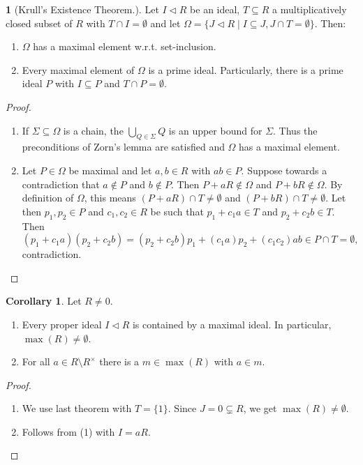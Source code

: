 \documentclass[12pt,a4paper]{report}
\theoremstyle{definition}
\newtheorem{corollary}[theorem]{Corollary} %
\theoremstyle{num.custom-title}
\newtheorem{teo_custom-title}[theorem]{} %
\DeclareMathOperator{\sm}{\setminus}
\DeclareMathOperator{\sse}{\subseteq}
\begin{document}
\begin{teo_custom-title}[Krull's Existence Theorem.] Let $I \lhd R$ be an ideal, $T \sse R$ a multiplicatively closed subset of $R$ with $T \cap I = \emptyset$ and let $\Omega=\{J \lhd R \mid I \sse J, J \cap T = \emptyset\}$. Then:
\begin{enumerate}
\item $\Omega$ has a maximal element w.r.t. set-inclusion.
\item Every maximal element of $\Omega$ is a prime ideal. Particularly, there is a prime ideal $P$ with $I \sse P$ and $T \cap P = \emptyset$.
\end{enumerate}
\begin{proof}\ 
\begin{enumerate}
\item If $\Sigma \sse \Omega$ is a chain, the $\bigcup_{Q \in \Sigma} Q$ is an upper bound for $\Sigma$. Thus the preconditions of Zorn's lemma are satisfied and $\Omega$ has a maximal element.
\item Let $P \in \Omega$ be maximal and let $a,b \in R$ with $ab \in P$. Suppose towards a contradiction that $a \not\in P$ and $b \not\in P$. Then $P+aR \not\in \Omega$ and $P+bR \not\in \Omega$. By definition of $\Omega$, this means $(P+aR) \cap T \neq \emptyset$ and $(P+bR) \cap T \neq \emptyset$. Let then $p_1,p_2 \in P$ and $c_1,c_2 \in R$ be such that $p_1+c_1 a \in T$ and $p_2+c_2 b \in T$. Then
\[
(p_1+c_1 a)(p_2+c_2 b)=(p_2+c_2 b)p_1 + (c_1 a) p_2 + (c_1 c_2)ab \in P \cap T = \emptyset,
\]
contradiction.
\end{enumerate}
\end{proof}
\end{teo_custom-title}

\begin{corollary}
Let $R \neq 0$.
\begin{enumerate}
\item Every proper ideal $I \lhd R$ is contained by a maximal ideal. In particular, $\max(R) \neq \emptyset$.
\item For all $a \in R \sm R^\times$ there is a $m \in \max(R)$ with $a \in m$.
\end{enumerate}
\begin{proof}\ 
\begin{enumerate}
\item We use last theorem with $T=\{1\}$. Since $J=0 \subsetneq R$, we get $\max(R) \neq \emptyset$.
\item Follows from (1) with $I=aR$.
\end{enumerate}
\end{proof}
\end{corollary}
\end{document}
